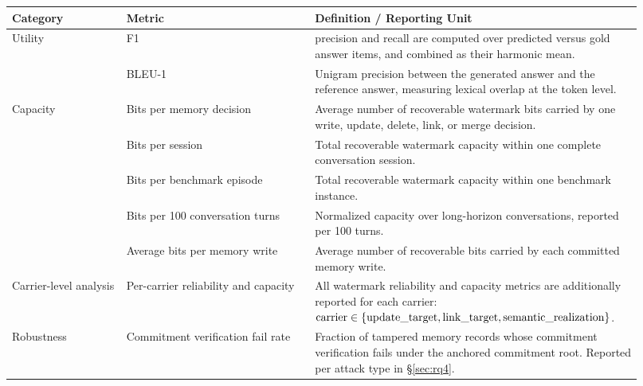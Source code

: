 \begin{table}[t]
\centering
\small
\setlength{\tabcolsep}{3.5pt}
\begin{tabular}{p{0.17\linewidth}p{0.29\linewidth}p{0.46\linewidth}}
\toprule
Category & Metric & Definition / Reporting Unit \\
\midrule

Utility
  & \locomo{} F1
  & precision and recall are computed over predicted versus gold answer
    items, and combined as their harmonic mean. \\

  & BLEU-1
  & Unigram precision between the generated answer and the reference
    answer, measuring lexical overlap at the token level. \\

\midrule

Capacity
  & Bits per memory decision
  & Average number of recoverable watermark bits carried by one write,
    update, delete, link, or merge decision. \\

  & Bits per session
  & Total recoverable watermark capacity within one complete conversation
    session. \\

  & Bits per benchmark episode
  & Total recoverable watermark capacity within one benchmark instance. \\

  & Bits per 100 conversation turns
  & Normalized capacity over long-horizon conversations, reported per
    100 turns. \\

  & Average bits per memory write
  & Average number of recoverable bits carried by each committed memory
    write. \\

\midrule

Carrier-level analysis
  & Per-carrier reliability and capacity
  & All watermark reliability and capacity metrics are additionally
    reported for each carrier:
    $\mathrm{carrier} \in
    \{\text{update\_target}, \text{link\_target},
    \text{semantic\_realization}\}$. \\

\midrule

Robustness
  & Commitment verification fail rate
  & Fraction of tampered memory records whose commitment verification
    fails under the anchored commitment root. Reported per attack type
    in \S\ref{sec:rq4}. \\


\end{tabular}
\end{table}
